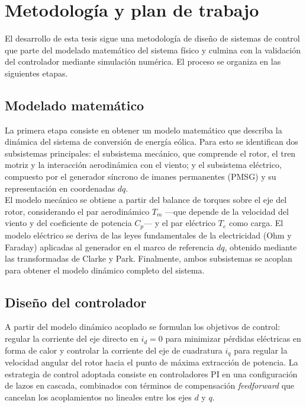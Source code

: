 \section{Metodología y plan de trabajo}

El desarrollo de esta tesis sigue una metodología de diseño de sistemas de 
control que parte del modelado matemático del sistema físico y culmina con 
la validación del controlador mediante simulación numérica. El proceso se 
organiza en las siguientes etapas.

\subsection{Modelado matemático}

La primera etapa consiste en obtener un modelo matemático que describa la 
dinámica del sistema de conversión de energía eólica. Para esto se 
identifican dos subsistemas principales: el subsistema mecánico, que 
comprende el rotor, el tren motriz y la interacción aerodinámica con el 
viento; y el subsistema eléctrico, compuesto por el generador síncrono de 
imanes permanentes (PMSG) y su representación en coordenadas $dq$.
\\

El modelo mecánico se obtiene a partir del balance de torques sobre el eje 
del rotor, considerando el par aerodinámico $T_m$ ---que depende de la 
velocidad del viento y del coeficiente de potencia $C_p$--- 
y el par eléctrico $T_e$ como carga. El modelo eléctrico se deriva de las 
leyes fundamentales de la electricidad (Ohm y Faraday) aplicadas al 
generador en el marco de referencia $dq$, obtenido mediante las 
transformadas de Clarke y Park. Finalmente, ambos subsistemas se acoplan 
para obtener el modelo dinámico completo del sistema.

\subsection{Diseño del controlador}

A partir del modelo dinámico acoplado se formulan los objetivos de control: 
regular la corriente del eje directo en $i_d = 0$ para minimizar pérdidas 
eléctricas en forma de calor y controlar la corriente del eje de cuadratura 
$i_q$ para regular la velocidad angular del rotor hacia el punto de máxima 
extracción de potencia. La estrategia de control adoptada consiste en 
controladores PI en una configuración de lazos en cascada, combinados con 
términos de compensación \emph{feedforward} que cancelan los acoplamientos 
no lineales entre los ejes $d$ y $q$.
\\

